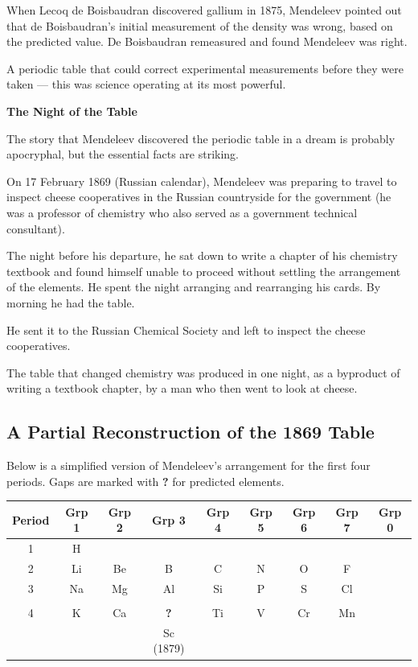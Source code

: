 \documentclass[12pt, a4paper]{book}
\begin{document}
\vspace{0.5em}

When Lecoq de Boisbaudran discovered gallium in 1875,
Mendeleev pointed out that de Boisbaudran's initial
measurement of the density was wrong,
based on the predicted value.
De Boisbaudran remeasured and found Mendeleev was right.

A periodic table that could correct experimental measurements
before they were taken --- this was science operating
at its most powerful.

\begin{historybox}
\textbf{The Night of the Table}

The story that Mendeleev discovered the periodic table
in a dream is probably apocryphal, but the essential facts
are striking.

On 17 February 1869 (Russian calendar), Mendeleev was
preparing to travel to inspect cheese cooperatives
in the Russian countryside for the government
(he was a professor of chemistry who also served as
a government technical consultant).

The night before his departure, he sat down to write
a chapter of his chemistry textbook and found himself
unable to proceed without settling the arrangement of
the elements.
He spent the night arranging and rearranging his cards.
By morning he had the table.

He sent it to the Russian Chemical Society and left
to inspect the cheese cooperatives.

The table that changed chemistry was produced in one night,
as a byproduct of writing a textbook chapter,
by a man who then went to look at cheese.
\end{historybox}

\subsection{A Partial Reconstruction of the 1869 Table}

Below is a simplified version of Mendeleev's arrangement
for the first four periods.
Gaps are marked with \textbf{?} for predicted elements.

\begin{center}
\setlength{\tabcolsep}{4pt}
\small
\begin{tabular}{c|cccccccc}
\toprule
Period & Grp 1 & Grp 2 & Grp 3 & Grp 4 & Grp 5 & Grp 6 & Grp 7 & Grp 0 \\
\midrule
1 & H & & & & & & & \\
2 & Li & Be & B & C & N & O & F & \\
3 & Na & Mg & Al & Si & P & S & Cl & \\
  & & & & & & & & \\
4 & K & Ca & \cellcolor{PredictedCell}\textbf{?} & Ti & V & Cr & Mn & \\
  & & & Sc (1879) & & & & & \\
\bottomrule
\end{tabular}
\end{center}
\end{document}
